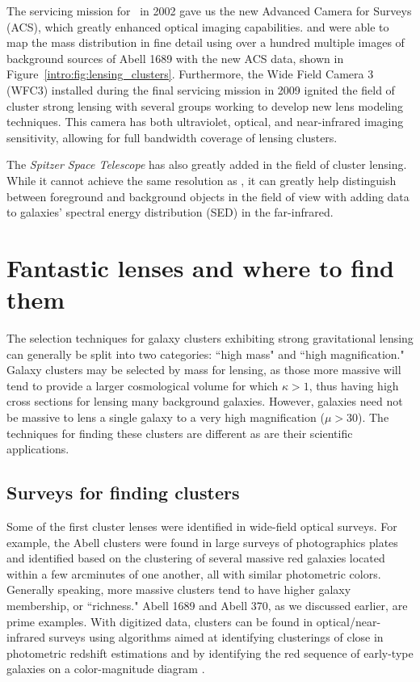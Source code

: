 The servicing mission for \hst\ in 2002 gave us the new Advanced Camera for Surveys (ACS), which greatly enhanced optical imaging capabilities. \citet{Broadhurst:2005qy} and \citet{Halkola:2006ss} were able to map the mass distribution in fine detail using over a hundred multiple images of background sources of Abell 1689 with the new ACS data, shown in Figure~\ref{intro:fig:lensing_clusters}. Furthermore, the Wide Field Camera 3 (WFC3) installed during the final servicing mission in 2009 ignited the field of cluster strong lensing with several groups working to develop new lens modeling techniques. This camera has both ultraviolet, optical, and near-infrared imaging sensitivity, allowing for full bandwidth coverage of lensing clusters.

The {\it Spitzer Space Telescope} has also greatly added in the field of cluster lensing. While it cannot achieve the same resolution as \hst, it can greatly help distinguish between foreground and background objects in the field of view with adding data to galaxies' spectral energy distribution (SED) in the far-infrared.

\section{Fantastic lenses and where to find them}

The selection techniques for galaxy clusters exhibiting strong gravitational lensing can generally be split into two categories: ``high mass" and ``high magnification." Galaxy clusters may be selected by mass for lensing, as those more massive will tend to provide a larger cosmological volume for which $\kappa>1$, thus having high cross sections for lensing many background galaxies. However, galaxies need not be massive to lens a single galaxy to a very high magnification ($\mu>30$). The techniques for finding these clusters are different as are their scientific applications.

\subsection{Surveys for finding clusters}

Some of the first cluster lenses were identified in wide-field optical surveys. For example, the Abell clusters \citep{Abell:1958mz,Zwicky:1968rm,Abell:1989ly} were found in large surveys of photographics plates and identified based on the clustering of several massive red galaxies located within a few arcminutes of one another, all with similar photometric colors. Generally speaking, more massive clusters tend to have higher galaxy membership, or ``richness." Abell 1689 and Abell 370, as we discussed earlier, are prime examples. With digitized data, clusters can be found in optical/near-infrared surveys using algorithms aimed at identifying clusterings of close in photometric redshift estimations \citep{Rykoff:2014rz} and by identifying the red sequence of early-type galaxies on a color-magnitude diagram \citep{Gladders:2000kq}.

